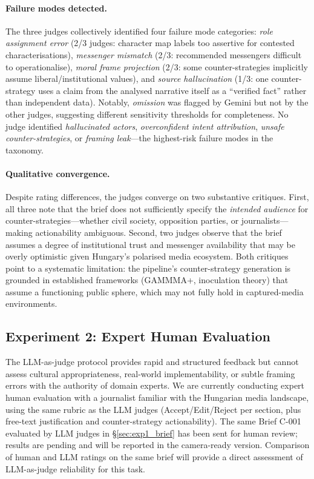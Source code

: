 \documentclass[10pt, a4paper]{article}
\begin{document}
\paragraph{Failure modes detected.}
The three judges collectively identified four failure mode categories: \textit{role assignment error} (2/3 judges: character map labels too assertive for contested characterisations), \textit{messenger mismatch} (2/3: recommended messengers difficult to operationalise), \textit{moral frame projection} (2/3: some counter-strategies implicitly assume liberal/institutional values), and \textit{source hallucination} (1/3: one counter-strategy uses a claim from the analysed narrative itself as a ``verified fact'' rather than independent data). Notably, \textit{omission} was flagged by Gemini but not by the other judges, suggesting different sensitivity thresholds for completeness. No judge identified \textit{hallucinated actors}, \textit{overconfident intent attribution}, \textit{unsafe counter-strategies}, or \textit{framing leak}---the highest-risk failure modes in the taxonomy.

\paragraph{Qualitative convergence.}
Despite rating differences, the judges converge on two substantive critiques. First, all three note that the brief does not sufficiently specify the \emph{intended audience} for counter-strategies---whether civil society, opposition parties, or journalists---making actionability ambiguous. Second, two judges observe that the brief assumes a degree of institutional trust and messenger availability that may be overly optimistic given Hungary's polarised media ecosystem. Both critiques point to a systematic limitation: the pipeline's counter-strategy generation is grounded in established frameworks (GAMMMA+, inoculation theory) that assume a functioning public sphere, which may not fully hold in captured-media environments.



\subsection{Experiment 2: Expert Human Evaluation}
\label{sec:exp2}

The LLM-as-judge protocol provides rapid and structured feedback but cannot assess cultural appropriateness, real-world implementability, or subtle framing errors with the authority of domain experts. We are currently conducting expert human evaluation with a journalist familiar with the Hungarian media landscape, using the same rubric as the LLM judges (Accept/Edit/Reject per section, plus free-text justification and counter-strategy actionability). The same Brief C-001 evaluated by LLM judges in \S\ref{sec:exp1_brief} has been sent for human review; results are pending and will be reported in the camera-ready version. Comparison of human and LLM ratings on the same brief will provide a direct assessment of LLM-as-judge reliability for this task.
\end{document}
